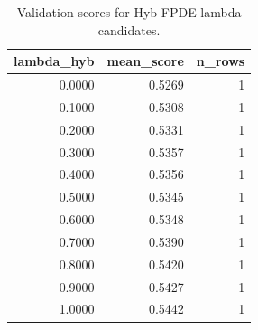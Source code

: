 \begin{table}[t]
\caption{Validation scores for Hyb-FPDE lambda candidates.}
\label{tab:lambda_distribution_computed}
\centering
\begin{tabular}{rrr}
\toprule
lambda\_hyb & mean\_score & n\_rows \\
\midrule
0.0000 & 0.5269 & 1 \\
0.1000 & 0.5308 & 1 \\
0.2000 & 0.5331 & 1 \\
0.3000 & 0.5357 & 1 \\
0.4000 & 0.5356 & 1 \\
0.5000 & 0.5345 & 1 \\
0.6000 & 0.5348 & 1 \\
0.7000 & 0.5390 & 1 \\
0.8000 & 0.5420 & 1 \\
0.9000 & 0.5427 & 1 \\
1.0000 & 0.5442 & 1 \\
\bottomrule
\end{tabular}

\end{table}
